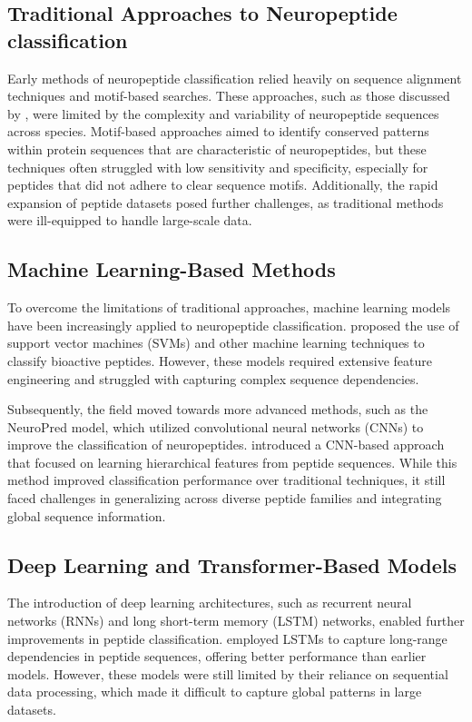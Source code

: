 \documentclass[conference]{IEEEtran}
\begin{document}
\subsection{Traditional Approaches to Neuropeptide classification} Early methods of neuropeptide classification relied heavily on sequence alignment techniques and motif-based searches. These approaches, such as those discussed by \cite{meydan2013}, were limited by the complexity and variability of neuropeptide sequences across species. Motif-based approaches aimed to identify conserved patterns within protein sequences that are characteristic of neuropeptides, but these techniques often struggled with low sensitivity and specificity, especially for peptides that did not adhere to clear sequence motifs. Additionally, the rapid expansion of peptide datasets posed further challenges, as traditional methods were ill-equipped to handle large-scale data.

\subsection{Machine Learning-Based Methods} To overcome the limitations of traditional approaches, machine learning models have been increasingly applied to neuropeptide classification. \cite{salam2024} proposed the use of support vector machines (SVMs) and other machine learning techniques to classify bioactive peptides. However, these models required extensive feature engineering and struggled with capturing complex sequence dependencies.

Subsequently, the field moved towards more advanced methods, such as the NeuroPred model, which utilized convolutional neural networks (CNNs) to improve the classification of neuropeptides. \cite{li2008} introduced a CNN-based approach that focused on learning hierarchical features from peptide sequences. While this method improved classification performance over traditional techniques, it still faced challenges in generalizing across diverse peptide families and integrating global sequence information.

\subsection{Deep Learning and Transformer-Based Models} The introduction of deep learning architectures, such as recurrent neural networks (RNNs) and long short-term memory (LSTM) networks, enabled further improvements in peptide classification. \cite{yi2019} employed LSTMs to capture long-range dependencies in peptide sequences, offering better performance than earlier models. However, these models were still limited by their reliance on sequential data processing, which made it difficult to capture global patterns in large datasets.
\end{document}
